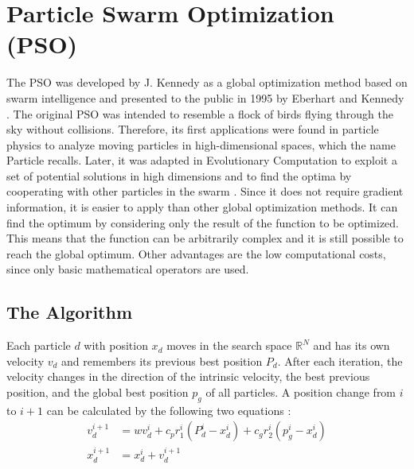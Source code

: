 \documentclass[
  oneside]{book}
\begin{document}
\hypertarget{particle-swarm-optimization-pso}{%
\chapter{Particle Swarm Optimization (PSO)}\label{particle-swarm-optimization-pso}}

The PSO was developed by J. Kennedy as a global optimization method based on swarm intelligence and presented to the public in 1995 by Eberhart and Kennedy \citep{KeEb1995}. The original PSO was intended to resemble a flock of birds flying through the sky without collisions. Therefore, its first applications were found in particle physics to analyze moving particles in high-dimensional spaces, which the name Particle recalls. Later, it was adapted in Evolutionary Computation to exploit a set of potential solutions in high dimensions and to find the optima by cooperating with other particles in the swarm \citep{PaVr2002}. Since it does not require gradient information, it is easier to apply than other global optimization methods. It can find the optimum by considering only the result of the function to be optimized. This means that the function can be arbitrarily complex and it is still possible to reach the global optimum. Other advantages are the low computational costs, since only basic mathematical operators are used.

\hypertarget{the-algorithm}{%
\section{The Algorithm}\label{the-algorithm}}

Each particle \(d\) with position \(x_d\) moves in the search space \(\mathbb{R}^N\) and has its own velocity \(v_d\) and remembers its previous best position \(P_d\). After each iteration, the velocity changes in the direction of the intrinsic velocity, the best previous position, and the global best position \(p_g\) of all particles. A position change from \(i\) to \(i+1\) can be calculated by the following two equations \citep{PaVr2002}:
\begin{align*}
  v_d^{i+1} &= wv_d^{i} + c_p r_1^i (P_d^i - x_d^i) + c_g r_2^i (p_g^i - x_d^i) \\
  x_d^{i+1} &= x_d^i + v_d^{i+1}
\end{align*}
\end{document}

